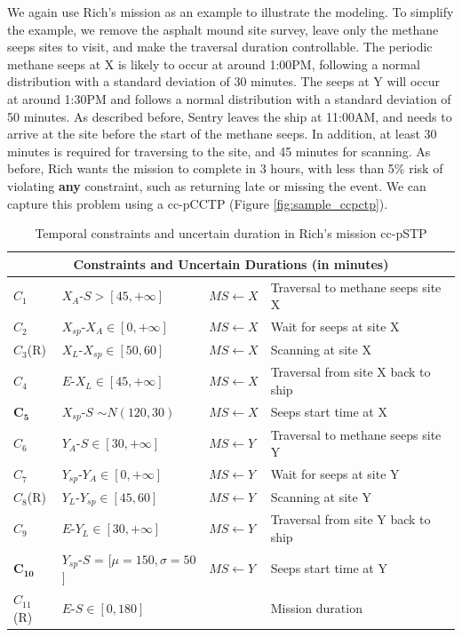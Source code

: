 \documentclass[jair,twoside,11pt,theapa]{article}
\begin{document}
We again use Rich's mission as an example to illustrate the modeling. To
simplify the example, we remove the asphalt mound site survey, leave only the methane seeps sites to visit, and make the traversal duration controllable. The
periodic methane seeps at X is likely to occur at around 1:00PM, following a normal distribution with
a standard deviation of 30 minutes. The seeps at Y will occur at around
1:30PM and follows a normal distribution with a standard deviation of 50
minutes. As described before, Sentry leaves the ship at 11:00AM, and needs to
arrive at the site before the start of the methane seeps. In addition, at least 30
minutes is required for traversing to the site, and 45 minutes for scanning. As
before, Rich wants the mission to complete in 3 hours, with less than 5\% risk
of violating \textbf{any} constraint, such as returning late or missing the event. We
can capture this problem using a cc-pCCTP (Figure \ref{fig:sample_ccpctp}).

\begin{table}[ht!]	
	\centering
	\caption{Temporal constraints and uncertain duration in Rich's mission cc-pSTP}
	\begin{tabular}{| m{1.5cm} m{4.5cm}  m{1.7cm} m{6.0cm}|}		
		\hline
		\multicolumn{4}{|c|}{\textbf{Constraints and Uncertain Durations (in minutes)}} \\		
		\hline		
		$C_{1}$ & $X_A$-$S > [45,+\infty]$ & $MS \leftarrow X$ & Traversal to methane seeps site X\\
		$C_{2}$ & $X_{sp}$-$X_A\in[0,+\infty]$ & $MS \leftarrow X$ & Wait for seeps at site X \\
		$C_{3}$(R) & $X_L$-$X_{sp}\in[50,60]$ & $MS \leftarrow X$ & Scanning at site X \\ 
		$C_{4}$ & $E$-$X_L\in[45,+\infty]$ & $MS \leftarrow X$ & Traversal from site X back to ship \\
		$\mathbf{C_{5}}$ & $X_{sp}$-$S$ $\sim$$N(120,30)$ & $MS \leftarrow X$ & Seeps start time at X \\
		$C_{6}$ & $Y_A$-$S\in[30,+\infty]$ & $MS \leftarrow Y$ & Traversal to methane seeps site Y\\
		$C_{7}$ & $Y_{sp}$-$Y_A\in[0,+\infty]$ & $MS \leftarrow Y$ & Wait for seeps at site Y \\
		$C_{8}$(R) & $Y_L$-$Y_{sp}\in[45,60]$ & $MS \leftarrow Y$ & Scanning at site Y \\ 
		$C_{9}$ & $E$-$Y_L\in[30,+\infty]$ & $MS \leftarrow Y$ & Traversal from site Y back to ship \\
		$\mathbf{C_{10}}$ & $Y_{sp}$-$S$ = [$\mu=150,\sigma=50$] & $MS \leftarrow Y$ & Seeps start time at Y \\  
		$C_{11}$(R) & $E$-$S\in[0,180]$ & & Mission duration \\  
		\hline
	\end{tabular}
	\label{table:ccpctp_constraints}
\end{table}
\end{document}
